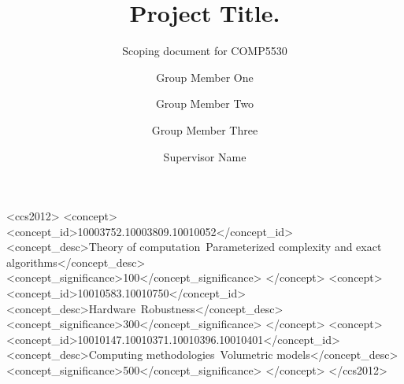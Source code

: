 \documentclass[acmtog, nonacm]{acmart}
\begin{document}
\title{Project Title.}
\subtitle{Scoping document for COMP5530}

\author{Group Member One}
\author{Group Member Two}
\authornotemark[1]
\author{Group Member Three}
\authornotemark[1]

\author{Supervisor Name}



\begin{CCSXML}
<ccs2012>
   <concept>
       <concept_id>10003752.10003809.10010052</concept_id>
       <concept_desc>Theory of computation~Parameterized complexity and exact algorithms</concept_desc>
       <concept_significance>100</concept_significance>
       </concept>
   <concept>
       <concept_id>10010583.10010750</concept_id>
       <concept_desc>Hardware~Robustness</concept_desc>
       <concept_significance>300</concept_significance>
       </concept>
   <concept>
       <concept_id>10010147.10010371.10010396.10010401</concept_id>
       <concept_desc>Computing methodologies~Volumetric models</concept_desc>
       <concept_significance>500</concept_significance>
       </concept>
 </ccs2012>
\end{CCSXML}

\end{document}
